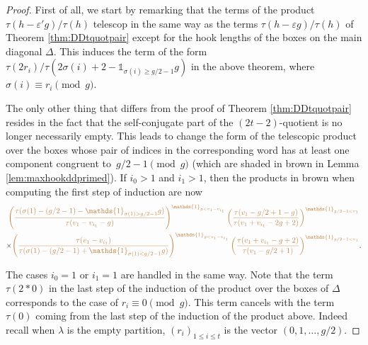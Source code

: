 \documentclass[11pt,letterpaper]{amsart}
\def\ccp{\mathcal P}
\numberwithin{equation}{section}
\numberwithin{df}{section}
\begin{document}
\begin{proof}
First of all, we start by remarking that the terms of the product \linebreak $\tau(h-\varepsilon' g)/\tau(h)$ telescop in the same way as the terms $\tau(h-\varepsilon g)/\tau(h)$ of Theorem \ref{thm:DDtquotpair} except for the hook lengths of the boxes on the main diagonal $\Delta$. 
This induces the term of the form $\tau(2r_i)/\tau(2\sigma(i)+2-\mathds{1}_{\sigma(i)\geq g/2-1}g)$ in the above theorem, where $\sigma(i)\equiv r_i\pmod{g}$.

The only other thing that differs from the proof of Theorem \ref{thm:DDtquotpair} resides in the fact that the self-conjugate part of the $(2t-2)$-quotient is no longer necessarily empty. This leads to change the form of the telescopic product over the boxes whose pair of indices in the corresponding word has at least one component congruent to~$g/2-1\pmod{g}$ (which are shaded in brown in Lemma \ref{lem:maxhookddprimed}).
If $i_0>1$ and $i_1>1$, then the products in brown when computing the first step of induction are now
\begin{multline*}
\textcolor{brown}{\left(\frac{\tau(\sigma(1)-(g/2-1)-\mathds{1}_{\sigma(1)>g/2-1}g)}{\tau(v_1-v_{i_1}-g)}\right)^{\mathds{1}_{g<v_1-v_{i_1}}}\left(\frac{\tau(v_1-g/2+1-g)}{\tau(v_1+v_{i_1}-2g+2)}\right)^{\mathds{1}_{g/2-1<v_1}}}\\
\times\textcolor{brown}{\left(\frac{\tau(v_1-v_{i_1})}{\tau(\sigma(1)-(g/2-1)+\mathds{1}_{\sigma(1)<g/2-1}g)}\right)^{\mathds{1}_{g<v_1-v_{i_1}}}\left(\frac{\tau(v_1+v_{i_1}-g+2)}{\tau(v_1-g/2+1)}\right)^{\mathds{1}_{g/2-1<v_1}}}.
\end{multline*}
 
The cases $i_0=1$ or $i_1=1$ are handled in the same way. Note that
the term $\tau(2*0)$ in the last step of the induction of the product over the boxes of $\Delta$ corresponds to the case of $r_i\equiv 0\pmod{g}$. This term cancels with the term $\tau(0)$ coming from the last step of the induction of the product above. Indeed recall when $\lambda$ is the empty partition, $(r_i)_{1\leq i\leq t}$ is the vector $(0,1,\dots,g/2)$.
\end{proof}





\end{document}
